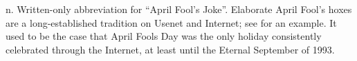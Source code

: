  n.
Written-only abbreviation for ``April Fool's Joke''. Elaborate April Fool's hoxes are a long-established tradition on Usenet and Internet;
see  for an example. It used to be the case that April Fools Day was the only holiday consistently celebrated through the
Internet, at least until the Eternal September of 1993.

